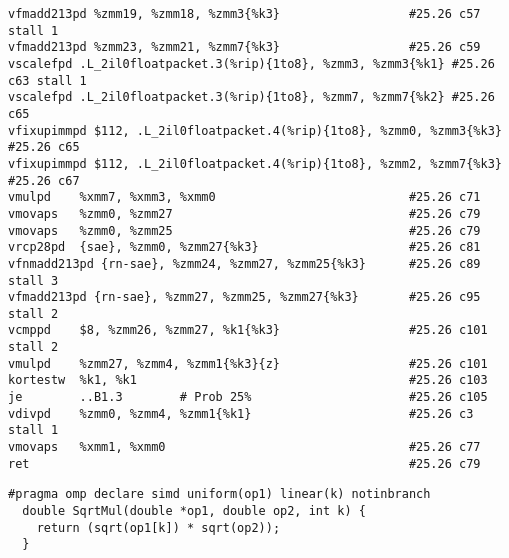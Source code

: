 \begin{verbatim}
vfmadd213pd %zmm19, %zmm18, %zmm3{%k3}                  #25.26 c57 stall 1
vfmadd213pd %zmm23, %zmm21, %zmm7{%k3}                  #25.26 c59
vscalefpd .L_2il0floatpacket.3(%rip){1to8}, %zmm3, %zmm3{%k1} #25.26 c63 stall 1
vscalefpd .L_2il0floatpacket.3(%rip){1to8}, %zmm7, %zmm7{%k2} #25.26 c65
vfixupimmpd $112, .L_2il0floatpacket.4(%rip){1to8}, %zmm0, %zmm3{%k3} #25.26 c65
vfixupimmpd $112, .L_2il0floatpacket.4(%rip){1to8}, %zmm2, %zmm7{%k3} #25.26 c67
vmulpd    %xmm7, %xmm3, %xmm0                           #25.26 c71
vmovaps   %zmm0, %zmm27                                 #25.26 c79
vmovaps   %zmm0, %zmm25                                 #25.26 c79
vrcp28pd  {sae}, %zmm0, %zmm27{%k3}                     #25.26 c81
vfnmadd213pd {rn-sae}, %zmm24, %zmm27, %zmm25{%k3}      #25.26 c89 stall 3
vfmadd213pd {rn-sae}, %zmm27, %zmm25, %zmm27{%k3}       #25.26 c95 stall 2
vcmppd    $8, %zmm26, %zmm27, %k1{%k3}                  #25.26 c101 stall 2
vmulpd    %zmm27, %zmm4, %zmm1{%k3}{z}                  #25.26 c101
kortestw  %k1, %k1                                      #25.26 c103
je        ..B1.3        # Prob 25%                      #25.26 c105
vdivpd    %zmm0, %zmm4, %zmm1{%k1}                      #25.26 c3 stall 1
vmovaps   %xmm1, %xmm0                                  #25.26 c77
ret                                                     #25.26 c79
\end{verbatim}

\begin{lstlisting}
#pragma omp declare simd uniform(op1) linear(k) notinbranch
  double SqrtMul(double *op1, double op2, int k) {
    return (sqrt(op1[k]) * sqrt(op2));
  }
\end{lstlisting}
